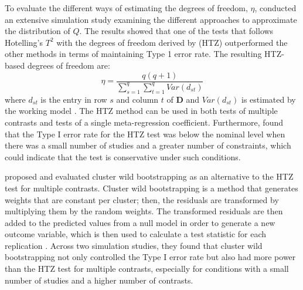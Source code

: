 To evaluate the different ways of estimating the degrees of freedom, $\eta$, \textcite{tipton2015b} conducted an extensive simulation study examining the different approaches to approximate the distribution of $Q$. The results showed that one of the tests that follows Hotelling's $T^2$ with the degrees of freedom derived by \textcite{zhang2012, zhang2013} (HTZ) outperformed the other methods in terms of maintaining Type 1 error rate. The resulting HTZ-based degrees of freedom are:
\begin{equation}\label{eq:HTZ_eta}
    \eta = \frac{q(q+1)}{\sum_{s=1}^q\sum_{t=1}^q Var(d_{st})}
\end{equation}
where $d_{st}$ is the entry in row $s$ and column $t$ of $\mathbf{D}$ and $Var(d_{st})$ is estimated by the working model \autocite{tipton2015b}. The HTZ method can be used in both tests of multiple contrasts and tests of a single meta-regression coefficient. Furthermore, \textcite{tipton2015b} found that the Type I error rate for the HTZ test was below the nominal level when there was a small number of studies and a greater number of constraints, which could indicate that the test is conservative under such conditions. 


\textcite{joshi_cluster_2022} proposed and evaluated cluster wild bootstrapping as an alternative to the HTZ test for multiple contrasts. Cluster wild bootstrapping is a method that generates weights that are constant per cluster; then, the residuals are transformed by multiplying them by the random weights. The transformed residuals are then added to the predicted values from a null model in order to generate a new outcome variable, which is then used to calculate a test statistic for each replication \autocite{joshi_cluster_2022}. Across two simulation studies, they found that cluster wild bootstrapping not only controlled the Type I error rate but also had more power than the HTZ test for multiple contrasts, especially for conditions with a small number of studies and a higher number of contrasts. 

